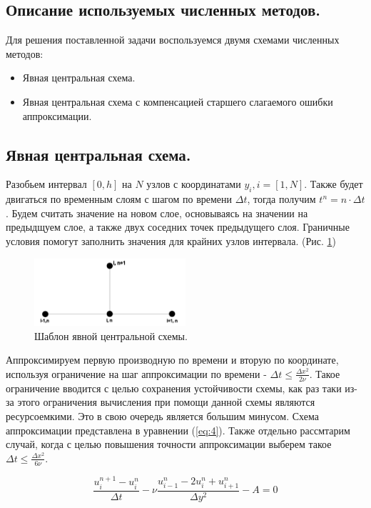\subsection{Описание используемых численных методов.}

Для решения поставленной задачи воспользуемся двумя схемами численных методов:
\begin{itemize}
    \item Явная центральная схема.
    \item Явная центральная схема с компенсацией старшего слагаемого ошибки аппроксимации.
\end{itemize}

\subsection{Явная центральная схема.}
Разобьем интервал $[0,h]$ на $N$ узлов с координатами $y_i, i=[1,N]$. Также будет двигаться по временным слоям с шагом по времени $\Delta t$, тогда получим $t^n = n \cdot \Delta t$. 
Будем считать значение на новом слое, основываясь на значении на предыдщуем слое, а также двух соседних точек предыдущего слоя. Граничные условия помогут заполнить значения для крайних узлов интервала. (Рис. \ref{fig:2})
\begin{figure}[H]
    \centering
    \includegraphics[width=0.5\textwidth]{images/2.png}
    \caption {Шаблон явной центральной схемы.}
    \label{fig:2}
\end{figure}

Аппроксимируем первую производную по времени и вторую по координате, используя ограничение на шаг аппроксимации по времени - $\Delta t \leq \frac{\Delta x^2}{2\nu}$. 
Такое ограничение вводится с целью сохранения устойчивости схемы, как раз таки из-за этого ограничения вычисления при помощи данной схемы являются ресурсоемкими. Это в свою очередь является большим минусом.
Схема аппроксимации представлена в уравнении (\ref{eq:4}).
Также отдельно рассмтарим случай, когда с целью повышения точности аппроксимации выберем такое $\Delta t \leq \frac{\Delta x^2}{6\nu}$.

\begin{equation}
    \frac{u^{n+1}_i-u^n_i}{\Delta t} - \nu \frac{u^n_{i-1}-2u^n_i+u^n_{i+1}}{\Delta y^2} - A =0
    \label{eq:4}
\end{equation}

